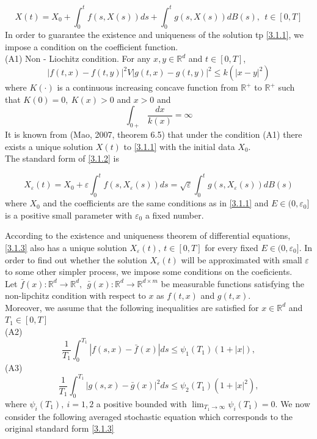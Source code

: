 \documentclass[a4 paper, 12pt]{report}
\theoremstyle{plain}
\begin{document}
\begin{equation}\label{3.1.2}
X(t) = X_0+\int_0^tf(s,X(s))ds+\int_0^tg(s,X(s))dB(s),~~t\in[0,T]
\end{equation}
In order to guarantee the existence and uniqueness of the solution tp \eqref{3.1.1}, we impose a condition on the coefficient function.\\

(A1) Non - Liochitz condition. For any $x,y\in\mathbb{R}^d$ and $t\in[0,T]$,
$$
\bigg|f(t,x)-f(t,y)\bigg|^2V\bigg|g(t,x)-g(t,y)\bigg|^2\leq k(\bigg|x-y\bigg|^2)
$$
where $K(\cdot)$ is a continuous increasing concave function from $\mathbb{R}^+$ to $\mathbb{R}^+$ such that $K(0) = 0,~K(x)>0$ and $x>0$ and
$$
\int_{0+}\frac{dx}{k(x)} = \infty
$$
It is known from (Mao, 2007, theorem 6.5) that under the condition (A1) there exists a unique solution $X(t)$ to \eqref{3.1.1} with the initial data $X_0$.\\
The standard form of \eqref{3.1.2} is

\begin{equation}\label{3.1.3}
X_\varepsilon(t) = X_0+\varepsilon\int_0^tf(s,X_\varepsilon(s))ds=\sqrt{\varepsilon}\int_0^t g(s,X_\varepsilon(s))dB(s)
\end{equation}
where $X_0$ and the coefficients are the same conditions as in \eqref{3.1.1} and $E\in(0,\varepsilon_0]$ is a positive small parameter with $\varepsilon_0$ a fixed number.\\
\par According to the existence and uniqueness theorem of differential equations, \eqref{3.1.3} also has a unique solution $X_\varepsilon(t),~t\in[0,T]$ for every fixed $E\in(0,\varepsilon_0]$. In order to find out whether the solution $X_\varepsilon(t)$ will be approximated with small $\varepsilon$ to some other simpler process, we impose some conditions on the coeficients.\\
Let $\bar{f}(x):\mathbb{R}^d\rightarrow\mathbb{R}^d,~~\bar{g}(x):\mathbb{R}^d\rightarrow\mathbb{R}^{d\times m}$ be measurable functions satisfying the non-lipchitz condition with respect to $x$ as $f(t,x)$ and $g(t,x)$.\\
Moreover, we assume that the following inequalities are satisfied for $x\in\mathbb{R}^d$ and $T_1\in[0,T]$\\
(A2)
$$
\frac{1}{T_1}\int_0^{T_1}|f(s,x)-\bar{f}(x)|ds\leq \psi_1(T_1)(1+|x|),
$$
(A3)
$$
\frac{1}{T_1}\int_0^{T_1}|g(s,x) - \bar{g}(x)|^2ds\leq \psi_2(T_1)(1+|x|^2),
$$
where $\psi_i(T_1), ~i = 1,2$ a positive bounded with $\lim_{T_1\rightarrow \infty}\psi_i(T_1) = 0$. We now consider the following averaged stochastic equation which corresponds to the original standard form \eqref{3.1.3}
\end{document}
